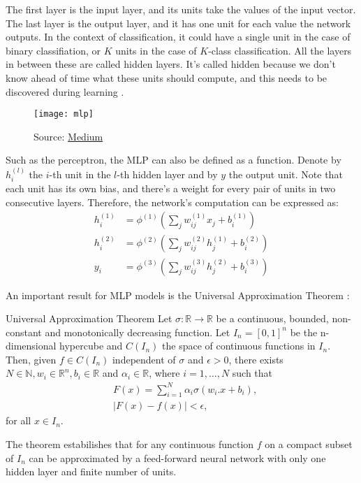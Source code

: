 The first layer is the input layer, and its units take the values of the input vector. The last layer is the output layer, and it has one unit for each value the network outputs. In the context of classification, it could have a single unit in the case of binary classifiation, or $K$ units in the case of $K$-class classification. All the layers in between these are called hidden layers. It's called hidden because we don't know ahead of time what these units should compute, and this needs to be discovered during learning \cite{grosse2021}.

\begin{figure}[H]
    \texttt{[image: mlp]}
    \caption{Source: \href{https://kinder-chen.medium.com/multilayer-perceptron-55bb39a08133}{Medium}}
\end{figure}
Such as the perceptron, the MLP can also be defined as a function. Denote by $h_i^{(l)}$ the $i$-th unit in the $l$-th hidden layer and by $y$ the output unit. Note that each unit has its own bias, and there's a weight for every pair of units in two consecutive layers. Therefore, the network's computation can be expressed as:
\begin{align}
    h_i^{(1)} &= \phi^{(1)} \left(\sum_j w_{ij}^{(1)}x_j + b_i^{(1)}\right) \nonumber \\
    h_i^{(2)} &= \phi^{(2)} \left(\sum_j w_{ij}^{(2)}h_j^{(1)} + b_i^{(2)}\right) \\
    y_i &= \phi^{(3)} \left(\sum_j w_{ij}^{(3)}h_j^{(2)} + b_i^{(3)}\right) \nonumber
\end{align}

An important result for MLP models is the Universal Approximation Theorem \cite{journals/mcss/Cybenko89}:
\begin{theorem}{Universal Approximation Theorem}{}
    Let $\sigma: \mathbb{R} \rightarrow \mathbb{R}$ be a continuous, bounded, non-constant and monotonically decreasing function. Let $I_{n}=[0,1]^{n}$ be the n-dimensional hypercube and $C\left(I_{n}\right)$ the space of continuous functions in $I_{n}$. Then, given $f \in C\left(I_{n}\right)$ independent of $\sigma$ and $\epsilon>0$, there exists $N \in \mathbb{N}, w_{i} \in \mathbb{R}^{n}, b_{i} \in \mathbb{R}$ and $\alpha_{i} \in \mathbb{R}$, where $i=1, \ldots, N$ such that 
    \[
    \begin{aligned}
    &F(x)=\sum_{i=1}^{N} \alpha_{i} \sigma\left(w_{i} . x+b_{i}\right), \\
    &|F(x)-f(x)|<\epsilon,
    \end{aligned}
    \]
    for all $x \in I_{n}$.
\end{theorem}
The theorem estabilishes that for any continuous function $f$ on a compact subset of $I_n$ can be approximated by a feed-forward neural network with only one hidden layer and finite number of units.

